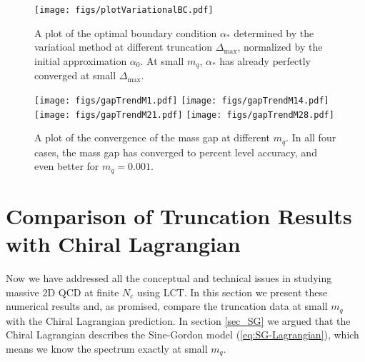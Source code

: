 \documentclass[12pt]{article}
\newcommand\De\Delta
\newcommand{\Dmax}{\De_{\max}}
\newcommand{\Nc}{N_c}
\begin{document}
\begin{figure}[ht]
\centering
\texttt{[image: figs/plotVariationalBC.pdf]}
\caption{
    \label{fig:variationalBC}
    A plot of the optimal boundary condition $\alpha_*$ determined by the variatioal method at different truncation $\Dmax$, normalized by the initial approximation $\alpha_0$. At small $m_q$, $\alpha_*$ has already perfectly converged at small $\Dmax$.
}
\end{figure}

\begin{figure}
\centering
\texttt{[image: figs/gapTrendM1.pdf]}
\texttt{[image: figs/gapTrendM14.pdf]}
\texttt{[image: figs/gapTrendM21.pdf]}
\texttt{[image: figs/gapTrendM28.pdf]}
\caption{
    \label{fig:gapConvergence}
    A plot of the convergence of the mass gap at different $m_q$. In all four cases, the mass gap has converged to percent level accuracy, and even better for $m_q=0.001$. 
}
\end{figure}




\section{Comparison of Truncation Results with Chiral Lagrangian}
\label{results}


Now we have addressed all the conceptual and technical issues in studying massive 2D QCD at finite $\Nc$ using LCT. In this section we present these numerical results and, as promised, compare the truncation data at small $m_q$ with the Chiral Lagrangian prediction. 
In section \ref{sec_SG} we argued that the Chiral Lagrangian describes the Sine-Gordon model (\ref{eq:SG-Lagrangian}), which means we know the spectrum exactly at small $m_q$. 
\end{document}

